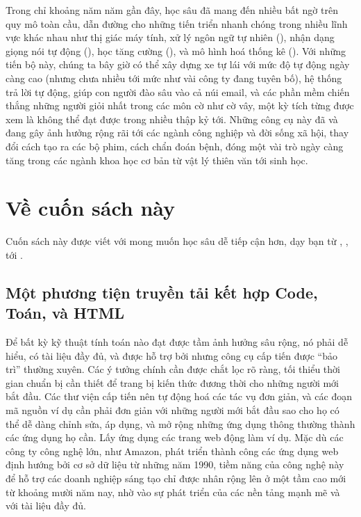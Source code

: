 \documentclass[letterpaper,11pt,english]{sphinxmanual}
\begin{document}
Trong chỉ khoảng năm năm gần đây, học sâu đã mang đến nhiều bất ngờ trên
quy mô toàn cầu, dẫn đường cho những tiến triển nhanh chóng trong nhiều
lĩnh vực khác nhau như thị giác máy tính, xử lý ngôn ngữ tự nhiên
(), nhận dạng giọng nói tự động (), học tăng cường (), và mô
hình hoá thống kê (). Với những tiến bộ này, chúng
ta bây giờ có thể xây dựng xe tự lái với mức độ tự động ngày càng cao
(nhưng chưa nhiều tới mức như vài công ty đang tuyên bố), hệ thống trả
lời tự động, giúp con người đào sâu vào cả núi email, và các phần mềm
chiến thắng những người giỏi nhất trong các môn cờ như cờ vây, một kỳ
tích từng được xem là không thể đạt được trong nhiều thập kỷ tới. Những
công cụ này đã và đang gây ảnh hưởng rộng rãi tới các ngành công nghiệp
và đời sống xã hội, thay đổi cách tạo ra các bộ phim, cách chẩn đoán
bệnh, đóng một vài trò ngày càng tăng trong các ngành khoa học cơ bản \textendash{}
từ vật lý thiên văn tới sinh học.








\section{Về cuốn sách này}
\label{\detokenize{chapter_preface/index_vn:ve-cuon-sach-nay}}


Cuốn sách này được viết với mong muốn học sâu dễ tiếp cận hơn, dạy bạn
từ , , tới .




\subsection{Một phương tiện truyền tải kết hợp Code, Toán, và HTML}
\label{\detokenize{chapter_preface/index_vn:mot-phuong-tien-truyen-tai-ket-hop-code-toan-va-html}}


Để bất kỳ kỹ thuật tính toán nào đạt được tầm ảnh hưởng sâu rộng, nó
phải dễ hiểu, có tài liệu đầy đủ, và được hỗ trợ bởi nhưng công cụ cấp
tiến được “bảo trì” thường xuyên. Các ý tưởng chính cần được chắt lọc rõ
ràng, tối thiểu thời gian chuẩn bị cần thiết để trang bị kiến thức đương
thời cho những người mới bắt đầu. Các thư viện cấp tiến nên tự động hoá
các tác vụ đơn giản, và các đoạn mã nguồn ví dụ cần phải đơn giản với
những người mới bắt đầu sao cho họ có thể dễ dàng chỉnh sửa, áp dụng, và
mở rộng những ứng dụng thông thường thành các ứng dụng họ cần. Lấy ứng
dụng các trang web động làm ví dụ. Mặc dù các công ty công nghệ lớn, như
Amazon, phát triển thành công các ứng dụng web định hướng bởi cơ sở dữ
liệu từ những năm 1990, tiềm năng của công nghệ này để hỗ trợ các doanh
nghiệp sáng tạo chỉ được nhân rộng lên ở một tầm cao mới từ khoảng mười
năm nay, nhờ vào sự phát triển của các nền tảng mạnh mẽ và với tài liệu
đầy đủ.
\end{document}

